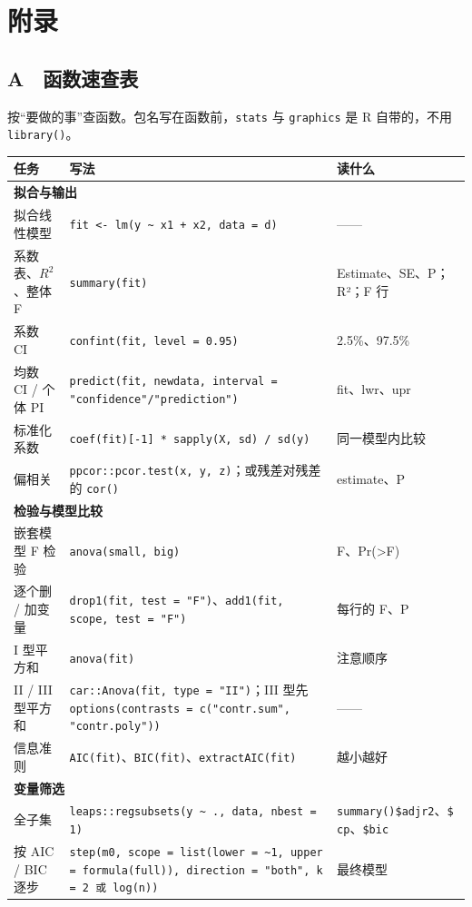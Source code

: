 \chapter{附录}
\section{A　函数速查表}
\label{app:cheat}
按“要做的事”查函数。包名写在函数前，\Verb|stats| 与 \Verb|graphics| 是 R 自带的，不用 \Verb|library()|。



\begin{tabular}{p{3.3cm}p{6.6cm}p{4.6cm}}
\toprule
任务 & 写法 & 读什么\\
\midrule


\multicolumn{3}{l}{\textbf{拟合与输出}}\\
拟合线性模型 & \Verb|fit <- lm(y ~ x1 + x2, data = d)| & ——\\
系数表、$R^2$、整体 F & \Verb|summary(fit)| & Estimate、SE、P；R²；F 行\\
系数 CI & \Verb|confint(fit, level = 0.95)| & 2.5\%、97.5\%\\
均数 CI / 个体 PI & \Verb|predict(fit, newdata, interval = "confidence"/"prediction")| & fit、lwr、upr\\
标准化系数 & \Verb|coef(fit)[-1] * sapply(X, sd) / sd(y)| & 同一模型内比较\\
偏相关 & \Verb|ppcor::pcor.test(x, y, z)|；或残差对残差的 \Verb|cor()| & estimate、P\\
\midrule
\multicolumn{3}{l}{\textbf{检验与模型比较}}\\
嵌套模型 F 检验 & \Verb|anova(small, big)| & F、Pr(>F)\\
逐个删 / 加变量 & \Verb|drop1(fit, test = "F")|、\Verb|add1(fit, scope, test = "F")| & 每行的 F、P\\
I 型平方和 & \Verb|anova(fit)| & 注意顺序\\
II / III 型平方和 & \Verb|car::Anova(fit, type = "II")|；III 型先 \Verb|options(contrasts = c("contr.sum", "contr.poly"))| & ——\\
信息准则 & \Verb|AIC(fit)|、\Verb|BIC(fit)|、\Verb|extractAIC(fit)| & 越小越好\\
\midrule
\multicolumn{3}{l}{\textbf{变量筛选}}\\
全子集 & \Verb|leaps::regsubsets(y ~ ., data, nbest = 1)| & \Verb|summary()$adjr2|、\Verb|$cp|、\Verb|$bic|\\
按 AIC / BIC 逐步 & \Verb|step(m0, scope = list(lower = ~1, upper = formula(full)), direction = "both", k = 2 或 log(n))| & 最终模型\\

\end{tabular}
